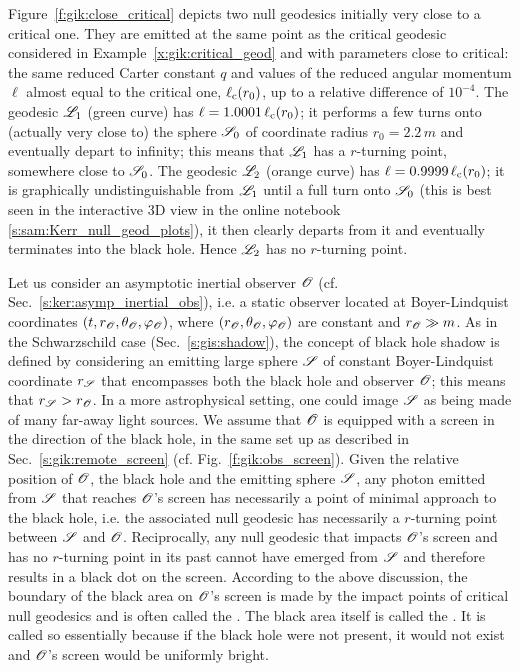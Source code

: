 \begin{example}
Figure~\ref{f:gik:close_critical} depicts
two null geodesics initially very close to a critical one.
They are emitted at the same point as the critical geodesic considered in Example~\ref{x:gik:critical_geod}
and with parameters close to critical: the same reduced Carter constant $q$
and values of the reduced angular momentum $\ell$ almost equal to the critical
one, $\ell_{\rm c}(r_0)$, up to a relative difference of $10^{-4}$.
The geodesic $\mathscr{L}_1$ (green curve) has $\ell = 1.0001\,\ell_{\rm c}(r_0)$; it performs a few
turns onto (actually very close to) the sphere $\mathscr{S}_0$ of coordinate radius $r_0 = 2.2\, m$ and eventually depart to infinity; this means that $\mathscr{L}_1$ has a $r$-turning point, somewhere close
to $\mathscr{S}_0$.
The geodesic $\mathscr{L}_2$ (orange curve) has $\ell = 0.9999\,\ell_{\rm c}(r_0)$; it is
graphically undistinguishable from $\mathscr{L}_1$ until a full turn onto $\mathscr{S}_0$
(this is best seen in the interactive 3D view in the online notebook \ref{s:sam:Kerr_null_geod_plots}),
it then clearly
departs from it and eventually terminates into the black hole. Hence $\mathscr{L}_2$ has no $r$-turning
point.
\end{example}

Let us consider an asymptotic inertial observer $\mathscr{O}$ (cf. Sec.~\ref{s:ker:asymp_inertial_obs}),
i.e. a static observer located at Boyer-Lindquist coordinates $(t,r_{\mathscr{O}},\theta_{\mathscr{O}},\varphi_{\mathscr{O}})$,
where $(r_{\mathscr{O}},\theta_{\mathscr{O}},\varphi_{\mathscr{O}})$ are constant and $r_{\mathscr{O}} \gg m$.
As in the Schwarzschild case (Sec.~\ref{s:gis:shadow}), the concept of
black hole shadow is defined by considering an emitting large sphere $\mathscr{S}$
of constant Boyer-Lindquist coordinate $r_{\mathscr{S}}$ that
encompasses both the black hole and observer $\mathscr{O}$; this means that
$r_{\mathscr{S}} > r_{\mathscr{O}}$. In a more astrophysical setting, one could image $\mathscr{S}$
as being made of many far-away light sources.
We assume that $\mathscr{O}$ is equipped with a screen in the
direction of the black hole, in the same set up as described in Sec.~\ref{s:gik:remote_screen}
(cf. Fig.~\ref{f:gik:obs_screen}). Given the relative position of $\mathscr{O}$, the black hole
and the emitting sphere $\mathscr{S}$, any photon emitted from $\mathscr{S}$ that reaches $\mathscr{O}$'s screen
has necessarily a point of minimal approach to the black hole, i.e. the associated
null geodesic has necessarily a $r$-turning point between $\mathscr{S}$ and $\mathscr{O}$.
Reciprocally, any null geodesic that impacts $\mathscr{O}$'s screen and has no
$r$-turning point in its past cannot have emerged from $\mathscr{S}$ and therefore
results in a black dot on the screen. According to the above discussion, the
boundary of the black area on $\mathscr{O}$'s screen is made by the impact points of
critical null geodesics and is often called the . The black area itself is called the
.
It is called so essentially because if the black hole were not present, it would
not exist and $\mathscr{O}$'s screen would be uniformly bright.

